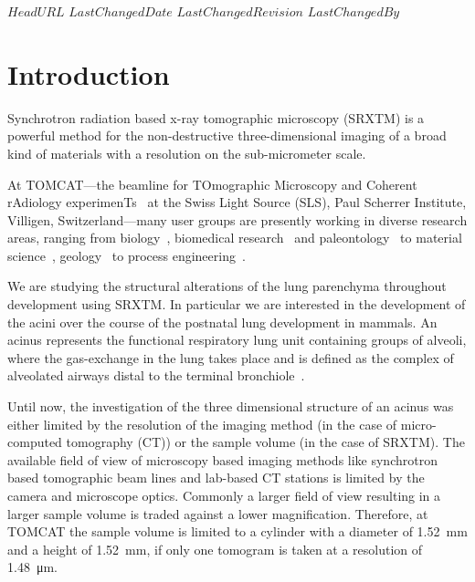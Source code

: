 \svnidlong
{$HeadURL$}
{$LastChangedDate$}
{$LastChangedRevision$}
{$LastChangedBy$}

\ifhtml
\else
\begin{center}
\end{center}
\fi

\section{Introduction}%
Synchrotron radiation based x-ray tomographic microscopy (SRXTM) is a powerful method for the non-destructive three-dimensional imaging of a broad kind of materials with a resolution on the sub-micrometer scale.

At TOMCAT---the beamline for TOmographic Microscopy and Coherent rAdiology experimenTs~\cite{Stampanoni2007} at the Swiss Light Source (SLS), Paul Scherrer Institute, Villigen, Switzerland---many user groups are presently working in diverse research areas, ranging from biology~\cite{McDonald2009,PerezHuerta2009}, biomedical research~\cite{Schittny2008,Tsuda2008,Heinzer2008} and paleontology~\cite{Gostling2008,Friis2007,Hagadorn2006,Donoghue2006} to material science~\cite{Gallucci2007}, geology~\cite{Carminati2007} to process engineering~\cite{Davenport2007,Vaucher2007}.

We are studying the structural alterations of the lung parenchyma throughout development using SRXTM. In particular we are interested in the development of the acini over the course of the postnatal lung development in mammals. An acinus represents the functional respiratory lung unit containing groups of alveoli, where the gas-exchange in the lung takes place and is defined as the complex of alveolated airways distal to the terminal bronchiole~\cite{Rodriguez1987}.

Until now, the investigation of the three dimensional structure of an acinus was either limited by the resolution of the imaging method (in the case of micro-computed tomography (\micro CT)) or the sample volume (in the case of SRXTM).  The available field of view of microscopy based imaging methods like synchrotron based tomographic beam lines and lab-based \micro CT stations is limited by the camera and microscope optics. Commonly a larger field of view resulting in a larger sample volume is traded against a lower magnification. Therefore, at TOMCAT the sample volume is limited to a cylinder with a diameter of \SI{1.52}{\milli\meter} and a height of \SI{1.52}{\milli\meter}, if only one tomogram is taken at a resolution of \SI{1.48}{\micro\meter}.


